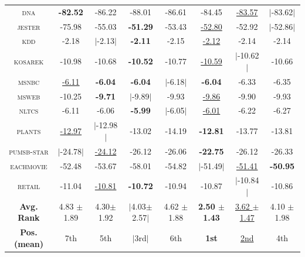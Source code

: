 \documentclass[14pt]{ffslides}
\newenvironment{vhcenterb}{\vspace*{\fill}\begin{center}}{\end{center}\vspace*{\fill}}
\begin{document}
\begin{vhcenterb}
{\begin{tabular}{c|ccccc|cc}
    \textsc{dna       } & \textbf{-82.52} & -86.22 & -88.01 & -86.61 & -84.45 & \underline{-83.57} & $|$-83.62$|$\\
    \textsc{jester    } & -75.98 & -55.03 & \textbf{-51.29} & -53.43 & \underline{-52.80} & -52.92 & $|$-52.86$|$\\
    \textsc{kdd       } & -2.18 & $|$-2.13$|$ & \textbf{-2.11} & -2.15 & \underline{-2.12} & -2.14 & -2.14\\
    \textsc{kosarek   } & -10.98 & -10.68 & \textbf{-10.52} & -10.77 & \underline{-10.59} & $|$-10.62$|$ & -10.66\\
    \textsc{msnbc     } & \underline{-6.11} & \textbf{-6.04} & \textbf{-6.04} & $|$-6.18$|$ & \textbf{-6.04} & -6.33 & -6.35\\
    \textsc{msweb     } & -10.25 & \textbf{-9.71} & $|$-9.89$|$ & -9.93 & \underline{-9.86} & -9.90 & -9.93\\
    \textsc{nltcs     } & -6.11 & -6.06 & \textbf{-5.99} & $|$-6.05$|$ & \underline{-6.01} & -6.22 & -6.27\\
    \textsc{plants    } & \underline{-12.97} & $|$-12.98$|$ & -13.02 & -14.19 & \textbf{-12.81} & -13.77 & -13.81\\
    \textsc{pumsb-star} & $|$-24.78$|$ & \underline{-24.12} & -26.12 & -26.06 & \textbf{-22.75} & -26.12 & -26.33\\
    \textsc{eachmovie } & -52.48 & -53.67 & -58.01 & -54.82 & $|$-51.49$|$ & \underline{-51.41} & \textbf{-50.95}\\
    \textsc{retail    } & -11.04 & \underline{-10.81} & \textbf{-10.72} & -10.94 & -10.87 & $|$-10.84$|$ & -10.86\\
    \hline
    \textbf{Avg. Rank} & 4.83 $\pm$ 1.89 & 4.30$ \pm$ 1.92 & $|$4.03$ \pm$ 2.57$|$ & 4.62 $\pm$ 1.88 & \textbf{2.50 $\pm$ 1.43} & \underline{3.62 $\pm$ 1.47} & 4.10 $\pm$ 1.98 \\
    \hline
    \textbf{Pos. (mean)} & 7th & 5th & $|$3rd$|$ & 6th & \textbf{1st} & \underline{2nd} & 4th \\
    \hline
  \end{tabular}
  }
\end{vhcenterb}

{\color{boxdgray}\cite{gens13,dang20,liang17,dimauro21,jaini18a}}

\end{document}
